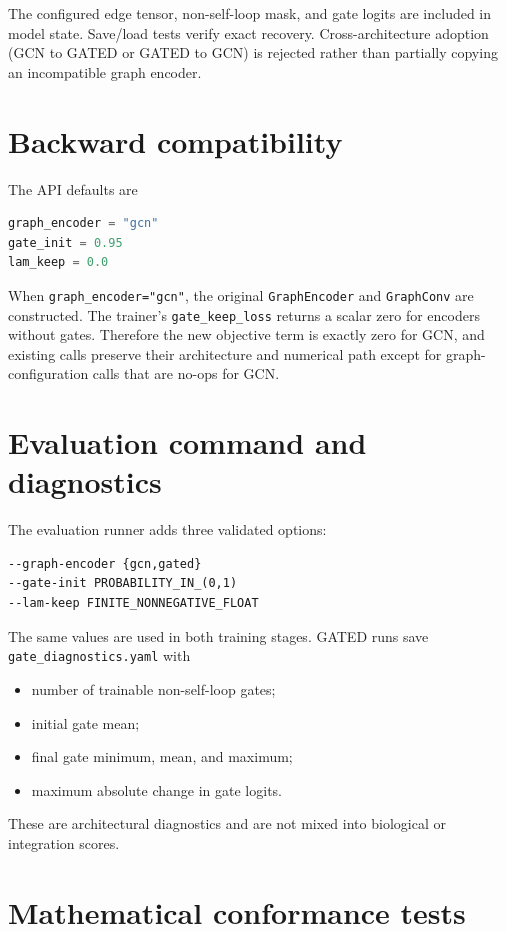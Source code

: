 \documentclass[11pt]{article}
\newcommand{\code}[1]{\texttt{#1}}
\begin{document}
The configured edge tensor, non-self-loop mask, and gate logits are included in
model state.  Save/load tests verify exact recovery.  Cross-architecture
adoption (GCN to GATED or GATED to GCN) is rejected rather than partially
copying an incompatible graph encoder.

\section{Backward compatibility}

The API defaults are
\begin{lstlisting}[language=Python]
graph_encoder = "gcn"
gate_init = 0.95
lam_keep = 0.0
\end{lstlisting}
When \code{graph\_encoder="gcn"}, the original \code{GraphEncoder} and
\code{GraphConv} are constructed.  The trainer's \code{gate\_keep\_loss}
returns a scalar zero for encoders without gates.  Therefore the new objective
term is exactly zero for GCN, and existing calls preserve their architecture
and numerical path except for graph-configuration calls that are no-ops for
GCN.

\section{Evaluation command and diagnostics}

The evaluation runner adds three validated options:
\begin{lstlisting}
--graph-encoder {gcn,gated}
--gate-init PROBABILITY_IN_(0,1)
--lam-keep FINITE_NONNEGATIVE_FLOAT
\end{lstlisting}
The same values are used in both training stages.  GATED runs save
\code{gate\_diagnostics.yaml} with
\begin{itemize}
  \item number of trainable non-self-loop gates;
  \item initial gate mean;
  \item final gate minimum, mean, and maximum;
  \item maximum absolute change in gate logits.
\end{itemize}
These are architectural diagnostics and are not mixed into biological or
integration scores.

\section{Mathematical conformance tests}
\end{document}
